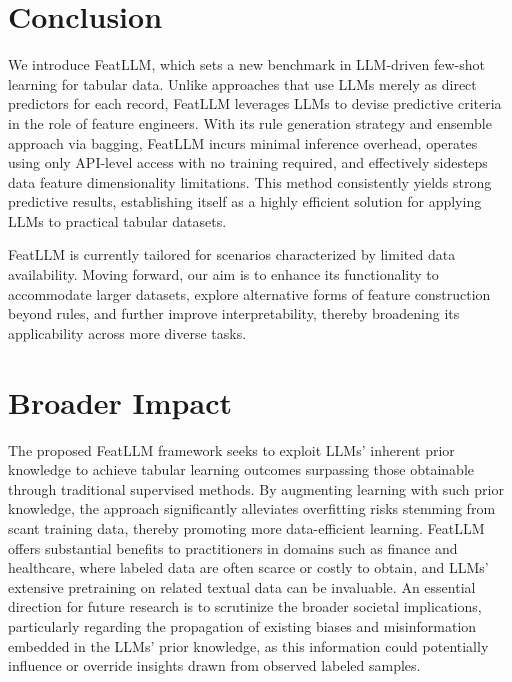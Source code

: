 \section{Conclusion}
We introduce \textsf{FeatLLM}, which sets a new benchmark in LLM-driven few-shot learning for tabular data. Unlike approaches that use LLMs merely as direct predictors for each record, \textsf{FeatLLM} leverages LLMs to devise predictive criteria in the role of feature engineers. With its rule generation strategy and ensemble approach via bagging, \textsf{FeatLLM} incurs minimal inference overhead, operates using only API-level access with no training required, and effectively sidesteps data feature dimensionality limitations. This method consistently yields strong predictive results, establishing itself as a highly efficient solution for applying LLMs to practical tabular datasets.

\textsf{FeatLLM} is currently tailored for scenarios characterized by limited data availability. Moving forward, our aim is to enhance its functionality to accommodate larger datasets, explore alternative forms of feature construction beyond rules, and further improve interpretability, thereby broadening its applicability across more diverse tasks.

\section{Broader Impact}
The proposed \textsf{FeatLLM} framework seeks to exploit LLMs’ inherent prior knowledge to achieve tabular learning outcomes surpassing those obtainable through traditional supervised methods. By augmenting learning with such prior knowledge, the approach significantly alleviates overfitting risks stemming from scant training data, thereby promoting more data-efficient learning. \textsf{FeatLLM} offers substantial benefits to practitioners in domains such as finance and healthcare, where labeled data are often scarce or costly to obtain, and LLMs’ extensive pretraining on related textual data can be invaluable. An essential direction for future research is to scrutinize the broader societal implications, particularly regarding the propagation of existing biases and misinformation embedded in the LLMs’ prior knowledge, as this information could potentially influence or override insights drawn from observed labeled samples.

